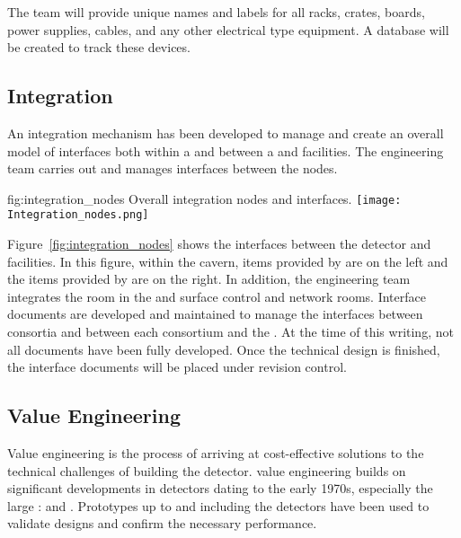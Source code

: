 The  team will provide unique names and labels
for all racks, crates, boards, power supplies, cables, and any other
electrical type equipment.  A database will be created to track these
devices.

\subsection{Integration}
\label{sec:es-tc-integ}

 An integration mechanism has been developed to manage and create an overall model of interfaces both within a  and between a  and facilities.
 The  engineering team carries out  and manages interfaces between the nodes.

\begin{dunefigure}{fig:integration_nodes}
  {Overall integration nodes and interfaces.}
  \texttt{[image: Integration\_nodes.png]}
\end{dunefigure}

Figure~\ref{fig:integration_nodes} shows the interfaces between the
detector and facilities. In this figure, within the cavern, items
provided by  are on the left and the items provided by
 are on the right. In addition, the  engineering
team integrates the  room in the  and
surface control and network rooms.  Interface documents are developed and maintained to manage the
interfaces %
between consortia and between %
each consortium and the  . At the time of this writing, not all
documents have been fully developed. Once the technical design is
finished, the interface documents will be placed under revision
control.

\subsection{Value Engineering}
\label{sec:es-tc-fdsp-coord-ve}

Value engineering is the process of arriving at cost-effective
solutions to the technical challenges of building the 
detector.  value engineering builds on significant
developments in  detectors dating to the early 1970s,
especially the large :  and
. Prototypes up to and including the  
detectors have been used to validate
 designs and confirm the necessary performance. 

